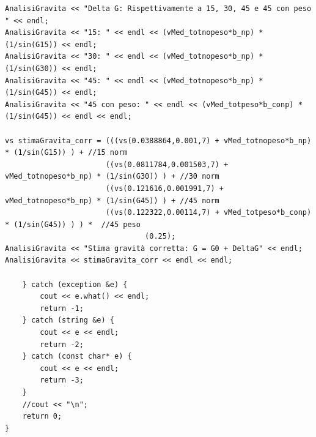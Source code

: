 \documentclass[12pt]{article} %
\begin{document}
\begin{verbatim}
AnalisiGravita << "Delta G: Rispettivamente a 15, 30, 45 e 45 con peso " << endl;
AnalisiGravita << "15: " << endl << (vMed_totnopeso*b_np) * (1/sin(G15)) << endl;
AnalisiGravita << "30: " << endl << (vMed_totnopeso*b_np) * (1/sin(G30)) << endl;
AnalisiGravita << "45: " << endl << (vMed_totnopeso*b_np) * (1/sin(G45)) << endl;
AnalisiGravita << "45 con peso: " << endl << (vMed_totpeso*b_conp) * (1/sin(G45)) << endl << endl;

vs stimaGravita_corr = (((vs(0.0388864,0.001,7) + vMed_totnopeso*b_np) * (1/sin(G15)) ) + //15 norm
	  	   	   	   	   ((vs(0.0811784,0.001503,7) + vMed_totnopeso*b_np) * (1/sin(G30)) ) + //30 norm
	  	   	   	   	   ((vs(0.121616,0.001991,7) + vMed_totnopeso*b_np) * (1/sin(G45)) ) + //45 norm
	  	   	   	   	   ((vs(0.122322,0.00114,7) + vMed_totpeso*b_conp) * (1/sin(G45)) ) ) *  //45 peso
	  	   	   	   			   	(0.25);
AnalisiGravita << "Stima gravità corretta: G = G0 + DeltaG" << endl;
AnalisiGravita << stimaGravita_corr << endl << endl;

	} catch (exception &e) {
		cout << e.what() << endl;
		return -1;
	} catch (string &e) {
		cout << e << endl;
		return -2;
	} catch (const char* e) {
		cout << e << endl;
		return -3;
	}
	//cout << "\n";
	return 0;
}
	\end{verbatim}
\end{document}
